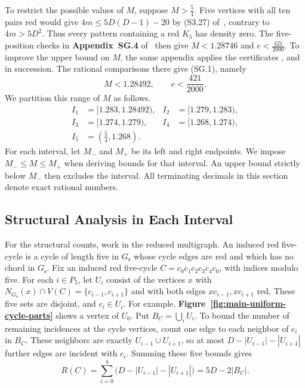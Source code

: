 \documentclass[preprint,11pt,numbers]{elsarticle-arxiv}
\numberwithin{equation}{section}
\theoremstyle{definition}
\begin{document}
To restrict the possible values of $M$, suppose $M>\frac{5}{4}$.
Five vertices with all ten pairs red
would give $4m\leq5D(D-1)-20$ by
(S3.27) of~\cite{FGSTSupplement}, contrary to
$4m>5D^2$. Thus every pattern containing a red $K_5$ has density
zero. The five-position checks in \textbf{Appendix~SG.4}
of~\cite{FGSTSupplement} then give $M<1.28746$ and
$e<\frac{421}{2000}$. To improve the upper bound on $M$, the
same appendix applies the certificates
, 
and  in succession. The rational
comparisons there give (SG.1), namely
\begin{equation}\label{eq:uniform-initial-range}
 M<1.28492,\qquad e<\frac{421}{2000}.
\end{equation}
We partition this range of $M$ as follows.
\begin{equation}\label{eq:uniform-partition}
\begin{aligned}
 I_1&=[1.283,1.28492), & I_2&=[1.279,1.283),\\
 I_3&=[1.274,1.279), & I_4&=[1.268,1.274),\\
 I_5&=\left(\frac{5}{4},1.268\right). &&
\end{aligned}
\end{equation}
For each interval, let $M_-$ and $M_+$ be its left and right
endpoints. We impose $M_-\leq M\leq M_+$ when deriving bounds for
that interval. An upper bound strictly below $M_-$ then excludes
the interval. All terminating decimals in this section denote exact
rational numbers.

\subsection{Structural Analysis in Each Interval}\label{subsec:uniform-structure}

For the structural counts, work in the reduced multigraph. An
induced red five-cycle is a cycle of length five in $G_{\mathrm s}$
whose cycle edges are red and which has no chord in $G_{\mathrm s}$.
Fix an induced red five-cycle $C=c_0c_1c_2c_3c_4c_0$, with indices
modulo five. For each $i\in P_5$, let $U_i$ consist of the vertices
$x$ with $N_{G_{\mathrm s}}(x)\cap V(C)=\{c_{i-1},c_{i+1}\}$
and with both edges $xc_{i-1},xc_{i+1}$ red.
These five sets are disjoint, and $c_i\in U_i$. For example,
\textbf{Figure~\ref{fig:main-uniform-cycle-parts}} shows a vertex of $U_0$.
Put $B_C=\bigcup_i U_i$. To bound the number of remaining incidences
at the cycle vertices, count one edge to each neighbor of $c_i$
in $B_C$. These neighbors are exactly $U_{i-1}\cup U_{i+1}$, so
at most $D-|U_{i-1}|-|U_{i+1}|$ further edges are incident with
$c_i$. Summing these five bounds gives
\begin{equation}\label{eq:main-uniform-cycle-capacity}
 R(C)=\sum_{i=0}^4\bigl(D-|U_{i-1}|-|U_{i+1}|\bigr)=5D-2|B_C|.
\end{equation}
\end{document}
